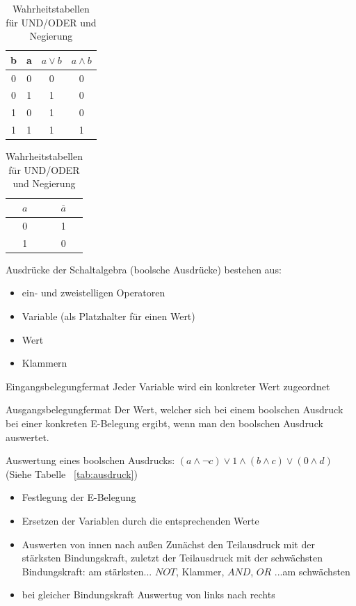\documentclass[10pt,a4paper]{scrartcl}
\newcommand{\reftbl}[1]{Tabelle ~\ref{#1}}
\begin{document}
\begin{table}[h]
	\centering
	\begin{minipage}[b]{0.4\textwidth}
		\centering
		\begin{tabular}{cc|c|c}
			b & a & $a \vee b$ & $a \wedge b$\\ \hline
			0 & 0 & 0 & 0\\
			0 & 1 & 1 & 0\\
			1 & 0 & 1 & 0\\
			1 & 1 & 1 & 1\\
		\end{tabular}
	\end{minipage}
	\begin{minipage}[b]{0.4\textwidth}
		\centering
		\begin{tabular}{c|c}
			$a$ & $\overline{a}$\\ \hline
			0 & 1\\
			1 & 0\\
		\end{tabular}
	\end{minipage}	
	\caption{Wahrheitstabellen für UND/ODER und Negierung}
\end{table}

Ausdrücke der Schaltalgebra (\glqq boolsche Ausdrücke\grqq) bestehen aus:
\begin{itemize}
	\item ein- und zweistelligen Operatoren
	\item Variable (als Platzhalter für einen Wert)
	\item Wert
	\item Klammern
\end{itemize}
\begin{Theorem}{Eingangsbelegung}{fermat}
	Jeder Variable wird ein konkreter Wert zugeordnet
\end{Theorem}
\begin{Theorem}{Ausgangsbelegung}{fermat}
	Der Wert, welcher sich bei einem boolschen Ausdruck bei einer konkreten E-Belegung ergibt, wenn man den boolschen Ausdruck \glqq auswertet\grqq.
\end{Theorem}

Auswertung eines boolschen Ausdrucks: $(a \wedge \neg c) \vee 1 \wedge(b \wedge c) \vee (0 \wedge d)$ (Siehe \reftbl{tab:ausdruck})
\begin{itemize}
	\item Festlegung der E-Belegung
	\item Ersetzen der Variablen durch die entsprechenden Werte
	\item Auswerten \glqq von innen nach außen\grqq
	\subitem Zunächst den Teilausdruck mit der stärksten Bindungskraft, zuletzt der Teilausdruck mit der schwächsten\\ Bindungskraft: am stärksten... $NOT$, Klammer, $AND$, $OR$ ...am schwächsten
	\item bei gleicher Bindungskraft Auswertug von links nach rechts
\end{itemize}
\end{document}
